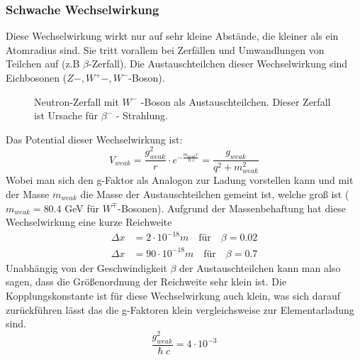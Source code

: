 \documentclass[Ex4_Zusammenfassung.tex]{subfiles}
\begin{document}
\subsubsection{Schwache Wechselwirkung}
Diese Wechselwirkung wirkt nur auf sehr kleine Abstände, die kleiner als ein Atomradius sind. Sie tritt vorallem bei Zerfällen und Umwandlungen von Teilchen auf (z.B  $\beta$-Zerfall). Die Austauschteilchen dieser Wechselwirkung sind Eichbosonen ($Z-,W^+-,W^-$-Boson).
\begin{figure}[H]
\centering
{}
					\caption{Neutron-Zerfall mit $W^-$ -Boson als Austauschteilchen. Dieser Zerfall ist Ursache für $ \beta^- $ - Strahlung.}
\end{figure}
Das Potential dieser Wechselwirkung ist:
\begin{equation}
V_{weak} = \frac{g_{weak}^2}{r} \cdot e^{-\frac{m_{weak} r}{\hslash c}} = \frac{g_{weak}}{q^2 + m_{weak}^2}
\end{equation}
Wobei man sich den g-Faktor als Analogon zur Ladung vorstellen kann und mit der Masse $ m_{weak} $ die Masse der Austauschteilchen gemeint ist, welche groß ist ( $m_{weak} = 80.4 $ GeV für $ W^{\mp} $-Bosonen).\newline
Aufgrund der Massenbehaftung hat diese Wechselwirkung eine kurze Reichweite 
\begin{align}
\Delta x &= 2 \cdot 10^{-18} m \quad \text{für}  \quad \beta = 0.02 \\
\Delta x &= 90 \cdot 10^{-18} m \quad \text{für} \quad \beta = 0.7
\end{align} 
Unabhängig von der Geschwindigkeit $\beta$ der Austauschteilchen kann man also sagen, dass die Größenordnung der Reichweite sehr klein ist. Die Kopplungskonstante ist für diese Wechselwirkung auch klein, was sich darauf zurückführen lässt das die g-Faktoren klein vergleichsweise zur Elementarladung sind. 
\begin{equation}
\frac{g_{weak}^2}{\hslash c} = 4 \cdot 10^{-3}
\end{equation} \newpage
\end{document}
